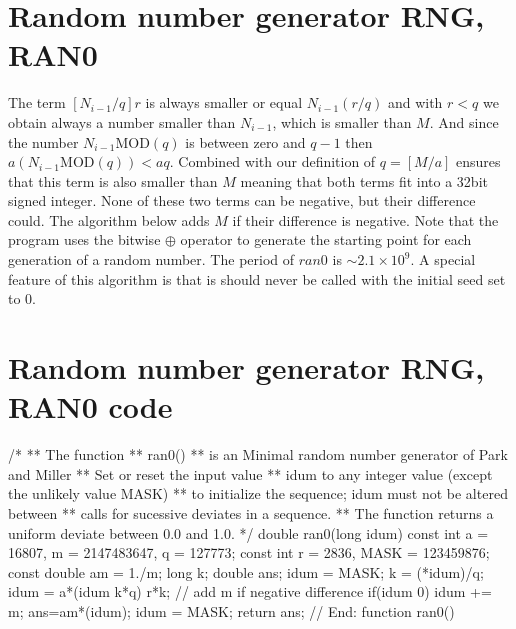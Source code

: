 \documentclass[letterpaper,10pt,english]{sphinxmanual}
\begin{document}
\section{Random number generator RNG, RAN0}
\label{\detokenize{chapter3:id12}}
The term \([N_{i-1}/q]r\) is always smaller or equal \(N_{i-1}(r/q)\) and with \(r < q\) we obtain always a
number smaller than \(N_{i-1}\), which is smaller than \(M\).
And since the number \(N_{i-1}\mathrm{MOD} (q)\) is between zero and \(q-1\) then
\(a(N_{i-1}\mathrm{MOD} (q))< aq\). Combined with our definition of \(q=[M/a]\) ensures that
this term is also smaller than \(M\) meaning that both terms fit into a
32\sphinxhyphen{}bit signed integer. None of these two terms can be negative, but their difference could.
The algorithm below adds \(M\) if their difference is negative.
Note that the program uses the bitwise \(\oplus\) operator to generate
the starting point for each generation of a random number. The period
of \(ran0\) is \(\sim 2.1\times 10^{9}\). A special feature of this
algorithm is that is should never be called with the initial seed
set to \(0\).


\section{Random number generator RNG, RAN0 code}
\label{\detokenize{chapter3:random-number-generator-rng-ran0-code}}
\begin{sphinxVerbatim}[commandchars=\\\{\}]
        /*
         ** The function
         **           ran0()
         ** is an \PYGZdq{}Minimal\PYGZdq{} random number generator of Park and Miller
         ** Set or reset the input value
         ** idum to any integer value (except the unlikely value MASK)
         ** to initialize the sequence; idum must not be altered between
         ** calls for sucessive deviates in a sequence.
         ** The function returns a uniform deviate between 0.0 and 1.0.
         */
    double ran0(long \PYGZam{}idum)
    \PYGZob{}
       const int a = 16807, m = 2147483647, q = 127773;
       const int r = 2836, MASK = 123459876;
       const double am = 1./m;
       long     k;
       double   ans;
       idum \PYGZca{}= MASK;
       k = (*idum)/q;
       idum = a*(idum \PYGZhy{} k*q) \PYGZhy{} r*k;
       // add m if negative difference
       if(idum \PYGZlt{} 0) idum += m;
       ans=am*(idum);
       idum \PYGZca{}= MASK;
       return ans;
    \PYGZcb{} // End: function ran0() 
\end{sphinxVerbatim}
\end{document}
